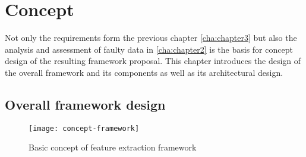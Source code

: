 \chapter{Concept\label{cha:chapter4}}

Not only the requirements form the previous chapter \ref{cha:chapter3} but also the analysis and assessment of faulty data in \ref{cha:chapter2} is the basis for concept design of the resulting framework proposal. This chapter introduces the design of the overall framework and its components as well as its architectural design.

\section{Overall framework design \label{sec:overalldesign}}

\begin{figure}[htb]
  \centering
  \texttt{[image: concept-framework]}\\
  \caption{Basic concept of feature extraction framework}
  \label{fig:basicconcept}
\end{figure}

